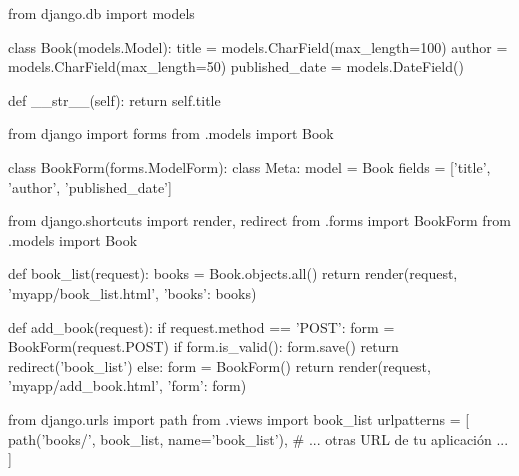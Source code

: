 from django.db import models

class Book(models.Model):
    title = models.CharField(max_length=100)
    author = models.CharField(max_length=50)
    published_date = models.DateField()

    def __str__(self):
        return self.title


from django import forms
from .models import Book

class BookForm(forms.ModelForm):
    class Meta:
        model = Book
        fields = ['title', 'author', 'published_date']
        




from django.shortcuts import render, redirect
from .forms import BookForm
from .models import Book

def book_list(request):
    books = Book.objects.all()
    return render(request, 'myapp/book_list.html', {'books': books})

def add_book(request):
    if request.method == 'POST':
        form = BookForm(request.POST)
        if form.is_valid():
            form.save()
            return redirect('book_list')
    else:
        form = BookForm()
    return render(request, 'myapp/add_book.html', {'form': form})
     


from django.urls import path
from .views import book_list
urlpatterns = [
    path('books/', book_list, name='book_list'),
    # ... otras URL de tu aplicación ...
]